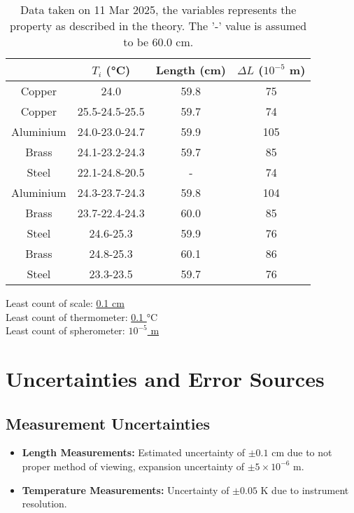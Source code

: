 \documentclass[%
 jor,
 amsmath,amssymb,
 reprint,
]{revtex4-2}
\begin{document}
\begin{table}[h]
\centering
\begin{tabular}{|c|ccc|}
    \hline
    & $T_i$ (\si{\celsius})  & Length (cm) & $\Delta L$ ($10^{-5}$ m)\\
    \hline
    Copper 	& 24.0     & 59.8 & 75 \\
    Copper 	& 25.5-24.5-25.5 & 59.7 & 74\\
    Aluminium 	& 24.0-23.0-24.7 & 59.9 & 105\\
    Brass 	& 24.1-23.2-24.3 & 59.7 & 85 \\
    Steel 	& 22.1-24.8-20.5 & - & 74 \\
    Aluminium 	& 24.3-23.7-24.3 & 59.8 & 104\\
    Brass 	& 23.7-22.4-24.3 & 60.0 & 85 \\
    Steel 	& 24.6-25.3 & 59.9 & 76 \\
    Brass	& 24.8-25.3 & 60.1 & 86 \\
    Steel 	& 23.3-23.5 & 59.7 & 76 \\ 
    \hline
\end{tabular}
\caption{Data taken on 11 Mar 2025, the variables represents the property as described in the theory. The '-' value is assumed to be 60.0 cm.}

\end{table}
\noindent Least count of scale: \uline{0.1 cm}  \\
Least count of thermometer:  \uline{ 0.1 $\si{\celsius}$ }\\
Least count of spherometer:  \uline{$10^{-5}$ m } \\


\section{Uncertainties and Error Sources}
\subsection{Measurement Uncertainties}
\begin{itemize}
    \item \textbf{Length Measurements:} Estimated uncertainty of $\pm 0.1$ cm due to not proper method of viewing, expansion uncertainty of $\pm 5\times 10^{-6}$ m.
    \item \textbf{Temperature Measurements:} Uncertainty of $\pm 0.05$ \si{\kelvin} due to instrument resolution.
\end{itemize}
\end{document}
